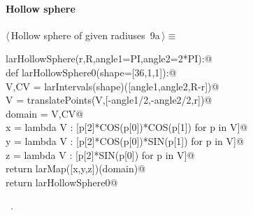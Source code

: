 \documentclass[11pt,oneside]{article}	%
\begin{document}
\paragraph{Hollow sphere}
\begin{flushleft} \small \label{scrap17}
\protect{}$\langle\,$Hollow sphere of given radiuses\nobreak\ {\footnotesize 9a}$\,\rangle\equiv$
\vspace{-1ex}
\begin{list}{}{} \item
\mbox{}\verb@def larHollowSphere(r,R,angle1=PI,angle2=2*PI):@\\
\mbox{}\verb@   def larHollowSphere0(shape=[36,1,1]):@\\
\mbox{}\verb@      V,CV = larIntervals(shape)([angle1,angle2,R-r])@\\
\mbox{}\verb@      V = translatePoints(V,[-angle1/2,-angle2/2,r])@\\
\mbox{}\verb@      domain = V,CV@\\
\mbox{}\verb@      x = lambda V : [p[2]*COS(p[0])*COS(p[1]) for p in V]@\\
\mbox{}\verb@      y = lambda V : [p[2]*COS(p[0])*SIN(p[1]) for p in V]@\\
\mbox{}\verb@      z = lambda V : [p[2]*SIN(p[0]) for p in V]@\\
\mbox{}\verb@      return larMap([x,y,z])(domain)@\\
\mbox{}\verb@   return larHollowSphere0@\\
\mbox{}\verb@@{\NWsep}
\end{list}
\vspace{-1ex}
\footnotesize\addtolength{\baselineskip}{-1ex}
\begin{list}{}{\setlength{\itemsep}{-\parsep}\setlength{\itemindent}{-\leftmargin}}
\item \NWtxtMacroRefIn\ .
\end{list}
\end{flushleft}
\end{document}
